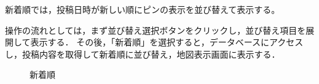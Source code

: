 新着順では，投稿日時が新しい順にピンの表示を並び替えて表示する。

操作の流れとしては，まず並び替え選択ボタンをクリックし，並び替え項目を展開して表示する．
その後，「新着順」を選択すると，データベースにアクセスし，投稿内容を取得して新着順に並び替え，地図表示画面に表示する．


\begin{figure}[H]
    \centering
    
    \caption{新着順}
\end{figure}